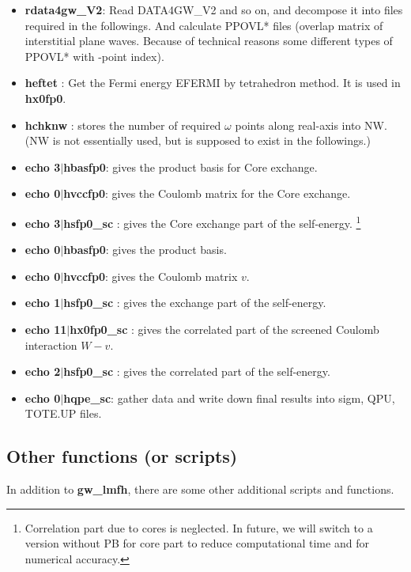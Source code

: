 {\begin{itemize}
\item{\bf rdata4gw\_V2}: 
  Read {\sf DATA4GW\_V2} and so on, and decompose it into files required
     in the followings. And calculate PPOVL* files (overlap matrix of
     interstitial plane waves. Because of technical reasons some
     different types of PPOVL* with \bfq-point index).
\item{\bf heftet   }: Get the Fermi energy {\sf EFERMI} by tetrahedron method. It is used in {\bf hx0fp0}.
\item{\bf hchknw   }: stores the number of required $\omega$ points along real-axis into {\sf NW}. \\
{\small ({\sf NW} is not essentially used, but is supposed to exist in the followings.)}
\item{\bf echo 3$|$hbasfp0}: gives the product basis for Core exchange.
\item{\bf echo 0$|$hvccfp0}: gives the Coulomb matrix for the Core exchange.
\item{\bf echo 3$|$hsfp0\_sc  }: gives the Core exchange part of the
     self-energy. \footnote{Correlation part due to cores is neglected.
     In future, we will switch to a version without PB for core part to
     reduce computational time and for numerical accuracy.}
\item{\bf echo 0$|$hbasfp0}: gives the product basis.
\item{\bf echo 0$|$hvccfp0}: gives the Coulomb matrix $v$.
\item{\bf echo 1$|$hsfp0\_sc  }: gives the exchange part of the self-energy.
\item{\bf echo 11$|$hx0fp0\_sc }: gives the correlated part of the screened Coulomb interaction $W-v$.
\item{\bf echo 2$|$hsfp0\_sc  }: gives the correlated part of the self-energy.
\item{\bf echo 0$|$hqpe\_sc}: gather data and write down final results
     into {\sf sigm}, {\sf QPU}, {\sf TOTE.UP} files.
\end{itemize}
\vspace{.3cm}



\vspace{3mm}
\subsection{\bf Other functions (or scripts)}
In addition to {\bf gw\_lmfh}, there are some other additional scripts 
and functions.

}
